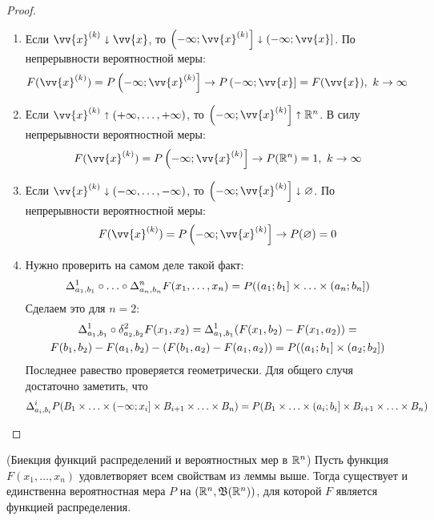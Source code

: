 \begin{proof}~
	\begin{enumerate}
		\item Если $\vv{x}^{(k)} \sda \vv{x}$, то $\rsi{-\infty; \vv{x}^{(k)}} \sda \rsi{-\infty; \vv{x}}$. По непрерывности вероятностной меры:
		\[
			F(\vv{x}^{(k)}) = P\rsi{-\infty; \vv{x}^{(k)}} \to P\rsi{-\infty; \vv{x}} = F(\vv{x}),\ k \to \infty
		\]
		
		\item Если $\vv{x}^{(k)} \sua (+\infty, \ldots, +\infty)$, то $\rsi{-\infty; \vv{x}^{(k)}} \sua \R^n$. В силу непрерывности вероятностной меры:
		\[
			F(\vv{x}^{(k)}) = P\rsi{-\infty; \vv{x}^{(k)}} \to P(\R^n) = 1,\ k \to \infty
		\]
		
		\item Если $\vv{x}^{(k)} \sda (-\infty, \ldots, -\infty)$, то $\rsi{-\infty; \vv{x}^{(k)}} \sda \emptyset$. По непрерывности вероятностной меры:
		\[
			F(\vv{x}^{(k)}) = P\rsi{-\infty; \vv{x}^{(k)}} \to P(\emptyset)  = 0
		\]
		
		\item Нужно проверить на самом деле такой факт:
		\[
			\Delta_{a_1, b_1}^1 \circ \ldots \circ \Delta_{a_n, b_n}^n F(x_1, \ldots, x_n) = P(\left(a_1; b_1\right] \times \ldots \times \left(a_n; b_n\right])
		\]
		Сделаем это для $n = 2$:
		\begin{multline*}
			\Delta_{a_1, b_1}^1 \circ \delta_{a_2, b_2}^2 F(x_1, x_2) = \Delta_{a_1, b_1}^1 (F(x_1, b_2) - F(x_1, a_2)) =
			\\
			F(b_1, b_2) - F(a_1, b_2) - (F(b_1, a_2) - F(a_1, a_2)) = P(\left(a_1; b_1\right] \times \left(a_2; b_2\right])
		\end{multline*}
		Последнее равество проверяется геометрически. Для общего случя достаточно заметить, что
		\[
			\Delta_{a_i, b_i}^i P(B_1 \times \ldots \times \left(-\infty; x_i\right] \times B_{i + 1} \times \ldots \times B_n) = P(B_1 \times \ldots \times \left(a_i; b_i\right] \times B_{i + 1} \times \ldots \times B_n)
		\]
	\end{enumerate}
\end{proof}

\begin{theorem} (Биекция функций распределений и вероятностных мер в $\mathbb{R}^n$)
	Пусть функция $F(x_1, \ldots, x_n)$ удовлетворяет всем свойствам из леммы выше. Тогда существует и единственна вероятностная мера $P$ на $(\mathbb{R}^n, \mathfrak{B}(\mathbb{R}^n))$, для которой $F$ является функцией распределения.
\end{theorem}

